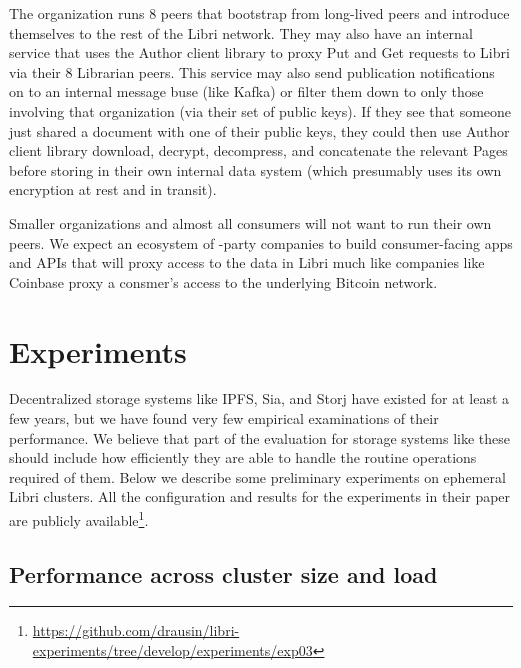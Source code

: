\documentclass[10pt]{article}
\begin{document}
The organization runs 8 peers that bootstrap from long-lived peers and introduce themselves to the rest of the Libri network. They may also have an internal service that uses the Author client library to proxy Put and Get requests to Libri via their 8 Librarian peers. This service may also send publication notifications on to an internal message buse (like Kafka) or filter them down to only those involving that organization (via their set of public keys). If they see that someone just shared a document with one of their public keys, they could then use Author client library download, decrypt, decompress, and concatenate the relevant Pages before storing in their own internal data system (which presumably uses its own encryption at rest and in transit).

Smaller organizations and almost all consumers will not want to run their own peers. We expect an ecosystem of -party companies to build consumer-facing apps and APIs that will proxy access to the data in Libri much like companies like Coinbase proxy a consmer's access to the underlying Bitcoin network.


\section{Experiments}
\label{sec:exps}

Decentralized storage systems like IPFS, Sia, and Storj have existed for at least a few years, but we have found very few empirical examinations of their performance. We believe that part of the evaluation for storage systems like these should include how efficiently they are able to handle the routine operations required of them. Below we describe some preliminary experiments on ephemeral Libri clusters. All the configuration and results for the experiments in their paper are publicly available\footnote{\url{https://github.com/drausin/libri-experiments/tree/develop/experiments/exp03}}.

\subsection{Performance across cluster size and load}
\end{document}
